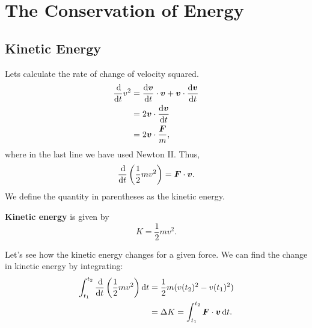 \documentclass[../classical_mechanics.tex]{subfiles}
\begin{document}
    \section{The Conservation of Energy}\label{sec:conservation-of-energy}
        \subsection{Kinetic Energy}\label{subsec:kinetic-energy}
            Lets calculate the rate of change of velocity squared.
            \begin{align}
                \dv{}{t}v^2&=\dv{\vec{v}}{t}\cdot\vec{v}+\vec{v}\cdot\dv{\vec{v}}{t}\\
                &=2\vec{v}\cdot\dv{\vec{v}}{t}\\
                &=2\vec{v}\cdot\frac{\vec{F}}{m},
            \end{align}
            where in the last line we have used Newton II. Thus,
            \begin{equation}
                \dv{}{t}\left(\frac{1}{2}mv^2\right)=\vec{F}\cdot\vec{v}.
            \end{equation}
            We define the quantity in parentheses as the kinetic energy.
            \begin{definition}
                \textbf{Kinetic energy} is given by
                \begin{equation}
                    K=\frac{1}{2}mv^2.
                \end{equation}
            \end{definition}
            Let's see how the kinetic energy changes for a given force. We can find the change in kinetic energy by integrating:
            \begin{align}
                \int_{t_1}^{t_2}\dv{}{t}\left(\frac{1}{2}mv^2\right)\dd{t}&=\frac{1}{2}m(v(t_2)^2-v(t_1)^2)\\
                &=\Delta K=\int_{t_1}^{t_2}\vec{F}\cdot\vec{v}\dd{t}.
            \end{align}
\end{document}
